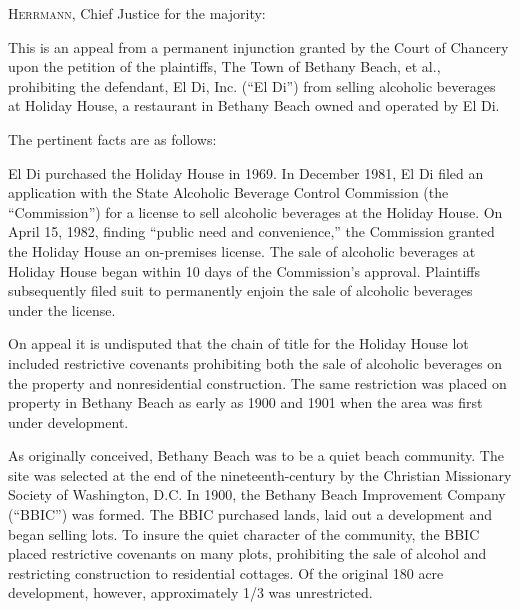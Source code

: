

\opinion \textsc{Herrmann}, Chief Justice for the majority:

This is an appeal from a permanent injunction granted by the Court of Chancery
upon the petition of the plaintiffs, The Town of Bethany Beach, et al.,
prohibiting the defendant, El Di, Inc. (``El Di'') from selling alcoholic
beverages at Holiday House, a restaurant in Bethany Beach owned and operated by
El Di.


The pertinent facts are as follows:

El Di purchased the Holiday House in 1969. In December 1981, El Di filed an
application with the State Alcoholic Beverage Control Commission (the
``Commission'') for a license to sell alcoholic beverages at the Holiday House.
On April 15, 1982, finding ``public need and convenience,'' the Commission
granted the Holiday House an on-premises license. The sale of alcoholic
beverages at Holiday House began within 10 days of the Commission's approval.
Plaintiffs subsequently filed suit to permanently enjoin the sale of alcoholic
beverages under the license.

On appeal it is undisputed that the chain of title for the Holiday House lot
included restrictive covenants prohibiting both the sale of alcoholic beverages
on the property and nonresidential construction. The same
restriction was placed on property in Bethany Beach as early as 1900 and 1901
when the area was first under development.

As originally conceived, Bethany Beach was to be a quiet beach community. The
site was selected at the end of the nineteenth-century by the Christian
Missionary Society of Washington, D.C. In 1900, the Bethany Beach Improvement
Company (``BBIC'') was formed. The BBIC purchased lands, laid out a development
and began selling lots. To insure the quiet character of the community, the BBIC
placed restrictive covenants on many plots, prohibiting the sale of alcohol and
restricting construction to residential cottages. Of the original 180 acre
development, however, approximately 1/3 was unrestricted.

